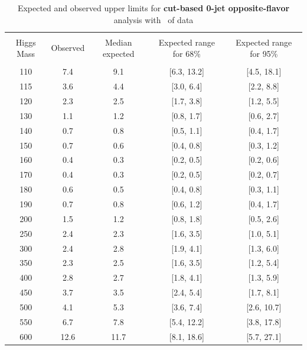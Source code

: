 \begin{table}[!hbp]
\begin{center}
\begin{tabular}{c c c c c}
\hline
\vspace{-3mm} && \\
 Higgs Mass   & Observed & Median expected & Expected range for 68\% & Expected range for 95\%   \\
\vspace{-3mm} && \\
\hline
110 & 7.4 & 9.1 & [6.3, 13.2] & [4.5, 18.1] \\
115 & 3.6 & 4.4 & [3.0, 6.4] & [2.2, 8.8] \\
120 & 2.3 & 2.5 & [1.7, 3.8] & [1.2, 5.5] \\
130 & 1.1 & 1.2 & [0.8, 1.7] & [0.6, 2.7] \\
140 & 0.7 & 0.8 & [0.5, 1.1] & [0.4, 1.7] \\
150 & 0.7 & 0.6 & [0.4, 0.8] & [0.3, 1.2] \\
160 & 0.4 & 0.3 & [0.2, 0.5] & [0.2, 0.6] \\
170 & 0.4 & 0.3 & [0.2, 0.5] & [0.2, 0.7] \\
180 & 0.6 & 0.5 & [0.4, 0.8] & [0.3, 1.1] \\
190 & 0.7 & 0.8 & [0.6, 1.2] & [0.4, 1.7] \\
200 & 1.5 & 1.2 & [0.8, 1.8] & [0.5, 2.6] \\
250 & 2.4 & 2.3 & [1.6, 3.5] & [1.0, 5.1] \\
300 & 2.4 & 2.8 & [1.9, 4.1] & [1.3, 6.0] \\
350 & 2.3 & 2.5 & [1.6, 3.5] & [1.2, 5.4] \\
400 & 2.8 & 2.7 & [1.8, 4.1] & [1.3, 5.9] \\
450 & 3.7 & 3.5 & [2.4, 5.4] & [1.7, 8.1] \\
500 & 4.1 & 5.3 & [3.6, 7.4] & [2.6, 10.7] \\
550 & 6.7 & 7.8 & [5.4, 12.2] & [3.8, 17.8] \\
600 & 12.6 & 11.7 & [8.1, 18.6] & [5.7, 27.1] \\
\hline
\end{tabular}
\caption{Expected and observed upper limits for {\bf cut-based 0-jet
    opposite-flavor} analysis with \intlumi\ of data}
\label{tab:of0_cut}
\end{center}
\end{table}

